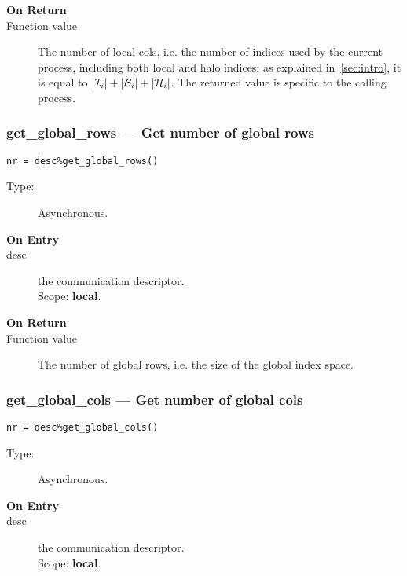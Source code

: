 \begin{description}
\item[\bf On Return]
\item[Function value] The number of local cols, i.e. the number of
  indices used by the current process, including both local and halo
  indices; as explained in~\ref{sec:intro}, 
  it is equal to  $|{\cal I}_i| + |{\cal B}_i| +|{\cal H}_i|$. The
  returned value is specific to the calling process. 
\end{description}


\subsubsection{get\_global\_rows --- Get number of global rows}

\begin{verbatim}
nr = desc%get_global_rows()
\end{verbatim}

\begin{description}
\item[Type:] Asynchronous.
\item[\bf On Entry]
\item[desc] the communication descriptor.\\
Scope: {\bf local}.\\
\end{description}

\begin{description}
\item[\bf On Return]
\item[Function value] The number of global rows, i.e. the size of the
  global index space. 
\end{description}

\subsubsection{get\_global\_cols --- Get number of global cols}

\begin{verbatim}
nr = desc%get_global_cols()
\end{verbatim}

\begin{description}
\item[Type:] Asynchronous.
\item[\bf On Entry]
\item[desc] the communication descriptor.\\
Scope: {\bf local}.\\
\end{description}

